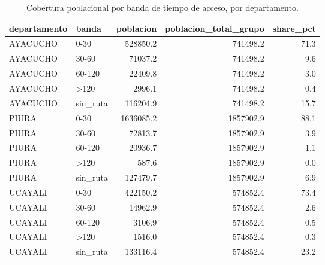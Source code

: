 \begin{table}
\caption{Cobertura poblacional por banda de tiempo de acceso, por departamento.}
\label{tab:cobertura}
\begin{tabular}{llrrr}
\toprule
departamento & banda & poblacion & poblacion\_total\_grupo & share\_pct \\
\midrule
AYACUCHO & 0-30 & 528850.2 & 741498.2 & 71.3 \\
AYACUCHO & 30-60 & 71037.2 & 741498.2 & 9.6 \\
AYACUCHO & 60-120 & 22409.8 & 741498.2 & 3.0 \\
AYACUCHO & >120 & 2996.1 & 741498.2 & 0.4 \\
AYACUCHO & sin\_ruta & 116204.9 & 741498.2 & 15.7 \\
PIURA & 0-30 & 1636085.2 & 1857902.9 & 88.1 \\
PIURA & 30-60 & 72813.7 & 1857902.9 & 3.9 \\
PIURA & 60-120 & 20936.7 & 1857902.9 & 1.1 \\
PIURA & >120 & 587.6 & 1857902.9 & 0.0 \\
PIURA & sin\_ruta & 127479.7 & 1857902.9 & 6.9 \\
UCAYALI & 0-30 & 422150.2 & 574852.4 & 73.4 \\
UCAYALI & 30-60 & 14962.9 & 574852.4 & 2.6 \\
UCAYALI & 60-120 & 3106.9 & 574852.4 & 0.5 \\
UCAYALI & >120 & 1516.0 & 574852.4 & 0.3 \\
UCAYALI & sin\_ruta & 133116.4 & 574852.4 & 23.2 \\
\bottomrule
\end{tabular}
\end{table}
